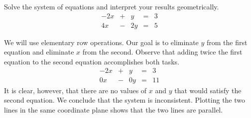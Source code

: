 \documentclass{ximera}
\begin{document}
\begin{example}\label{ex:systwoeqs2} Solve the system of equations and interpret your results geometrically.
$$\begin{array}{ccccc}
      -2x & +&y&= &3 \\
	 4x& -&2y&=&5
    \end{array}$$
\begin{explanation}
We will use elementary row operations.  Our goal is to eliminate $y$ from the first equation and eliminate $x$ from the second.  Observe that adding twice the first equation to the second equation accomplishes both tasks.
$$\begin{array}{ccccc}
      -2x & +&y&= &3 \\
	 0x& -&0y&=&11
    \end{array}$$
It is clear, however, that there are no values of $x$ and $y$ that would satisfy the second equation.  We conclude that the system is inconsistent.  Plotting the two lines in the same coordinate plane shows that the two lines are parallel.  
    \begin{center}
\end{center}
\end{explanation}
\end{example}
\end{document}
